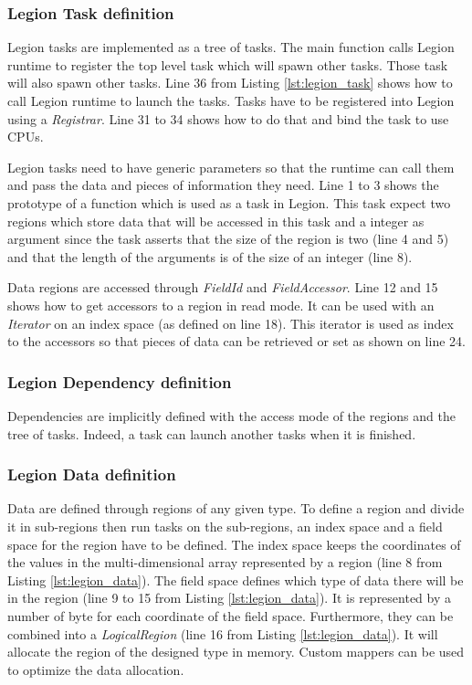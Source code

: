 

\subsubsection{Legion Task definition}
Legion tasks are implemented as a tree of tasks.
The main function calls Legion runtime to register the top level task which will spawn other tasks.
Those task will also spawn other tasks.
Line 36 from Listing \ref{lst:legion_task} shows how to call Legion runtime to launch the tasks.
Tasks have to be registered into Legion using a \textit{Registrar}.
Line 31 to 34 shows how to do that and bind the task to use CPUs.

Legion tasks need to have generic parameters so that the runtime can call them and pass the data and pieces of information they need.
Line 1 to 3 shows the prototype of a function which is used as a task in Legion.
This task expect two regions which store data that will be accessed in this task and a integer as argument since the task asserts that the size of the region is two (line 4 and 5) and that the length of the arguments is of the size of an integer (line 8).

Data regions are accessed through \textit{FieldId} and \textit{FieldAccessor}.
Line 12 and 15 shows how to get accessors to a region in read mode.
It can be used with an \textit{Iterator} on an index space (as defined on line 18).
This iterator is used as index to the accessors so that pieces of data can be retrieved or set as shown on line 24.




\subsubsection{Legion Dependency definition}
Dependencies are implicitly defined with the access mode of the regions and the tree of tasks.
Indeed, a task can launch another tasks when it is finished.

\subsubsection{Legion Data definition}
Data are defined through regions of any given type.
To define a region and divide it in sub-regions then run tasks on the sub-regions, an index space and a field space for the region have to be defined.
The index space keeps the coordinates of the values in the multi-dimensional array represented by a region (line 8 from Listing \ref{lst:legion_data}).
The field space defines which type of data there will be in the region (line 9 to 15 from Listing \ref{lst:legion_data}).
It is represented by a number of byte for each coordinate of the field space.
Furthermore, they can be combined into a \textit{LogicalRegion}  (line 16 from Listing \ref{lst:legion_data}).
It will allocate the region of the designed type in memory.
Custom mappers can be used to optimize the data allocation.

